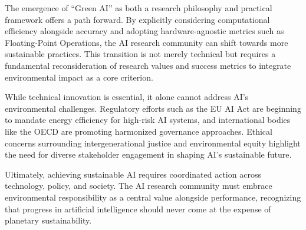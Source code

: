 \documentclass[twoside]{ai_ethics_class}
\begin{document}
The emergence of ``Green AI'' as both a research philosophy and practical framework offers a path forward.
By explicitly considering computational efficiency alongside accuracy and adopting hardware-agnostic metrics such as Floating-Point Operations, the AI research community can shift towards more sustainable practices.
This transition is not merely technical but requires a fundamental reconsideration of research values and success metrics to integrate environmental impact as a core criterion.

While technical innovation is essential, it alone cannot address AI’s environmental challenges.
Regulatory efforts such as the EU AI Act are beginning to mandate energy efficiency for high-risk AI systems, and international bodies like the OECD are promoting harmonized governance approaches.
Ethical concerns surrounding intergenerational justice and environmental equity highlight the need for diverse stakeholder engagement in shaping AI’s sustainable future.

Ultimately, achieving sustainable AI requires coordinated action across technology, policy, and society.
The AI research community must embrace environmental responsibility as a central value alongside performance, recognizing that progress in artificial intelligence should never come at the expense of planetary sustainability.





\end{document}
